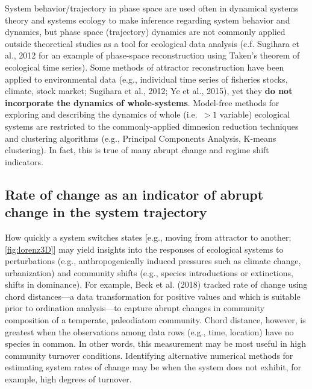 \documentclass[12pt,twoside,openany]{reedthesis}
\begin{document}
System behavior/trajectory in phase space are used often in dynamical systems theory and systems ecology to make inference regarding system behavior and dynamics, but phase space (trajectory) dynamics are not commonly applied outside theoretical studies as a tool for ecological data analysis (c.f. Sugihara et al., 2012 for an example of phase-space reconstruction using Taken's theorem of ecological time series). Some methods of attractor reconstruction have been applied to environmental data (e.g., individual time series of fisheries stocks, climate, stock market; Sugihara et al., 2012; Ye et al., 2015), yet they \textbf{do not incorporate the dynamics of whole-systems}. Model-free methods for exploring and describing the dynamics of whole (i.e.~\(>1\) variable) ecological systems are restricted to the commonly-applied dimnesion reduction techniques and clustering algorithms (e.g., Principal Components Analysis, K-means clustering). In fact, this is true of many abrupt change and regime shift indicators.

\hypertarget{rate-of-change-as-an-indicator-of-abrupt-change-in-the-system-trajectory}{%
\subsection{Rate of change as an indicator of abrupt change in the system trajectory}\label{rate-of-change-as-an-indicator-of-abrupt-change-in-the-system-trajectory}}

How quickly a system switches states {[}e.g., moving from attractor to another; \ref{fig:lorenz3D}{]} may yield insights into the responses of ecological systems to perturbations (e.g., anthropogenically induced pressures such as climate change, urbanization) and community shifts (e.g., species introductions or extinctions, shifts in dominance). For example, Beck et al. (2018) tracked rate of change using chord distances---a data transformation for positive values and which is suitable prior to ordination analysis---to capture abrupt changes in community composition of a temperate, paleodiatom community. Chord distance, however, is greatest when the observations among data rows (e.g., time, location) have no species in common. In other words, this measurement may be most useful in high community turnover conditions. Identifying alternative numerical methods for estimating system rates of change may be when the system does not exhibit, for example, high degrees of turnover.
\end{document}
